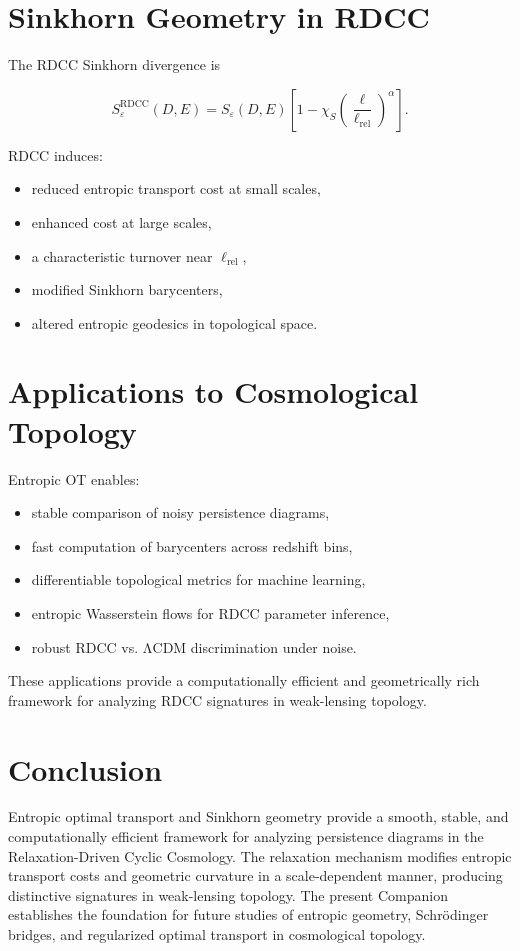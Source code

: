 \documentclass[11pt,a4paper]{article}
\begin{document}
\section{Sinkhorn Geometry in RDCC}

The RDCC Sinkhorn divergence is

\begin{equation}
    S^{\mathrm{RDCC}}_{\varepsilon}(D,E)
    = S_{\varepsilon}(D,E)
      \left[
        1 - \chi_{S}
        \left(\frac{\ell}{\ell_{\mathrm{rel}}}\right)^{\alpha}
      \right].
\end{equation}

RDCC induces:

\begin{itemize}
    \item reduced entropic transport cost at small scales,
    \item enhanced cost at large scales,
    \item a characteristic turnover near $\ell_{\mathrm{rel}}$,
    \item modified Sinkhorn barycenters,
    \item altered entropic geodesics in topological space.
\end{itemize}
\section{Applications to Cosmological Topology}

Entropic OT enables:

\begin{itemize}
    \item stable comparison of noisy persistence diagrams,
    \item fast computation of barycenters across redshift bins,
    \item differentiable topological metrics for machine learning,
    \item entropic Wasserstein flows for RDCC parameter inference,
    \item robust RDCC vs. ΛCDM discrimination under noise.
\end{itemize}

These applications provide a computationally efficient and geometrically rich 
framework for analyzing RDCC signatures in weak-lensing topology.
\section{Conclusion}

Entropic optimal transport and Sinkhorn geometry provide a smooth, stable, and 
computationally efficient framework for analyzing persistence diagrams in the 
Relaxation-Driven Cyclic Cosmology. The relaxation mechanism modifies entropic 
transport costs and geometric curvature in a scale-dependent manner, producing 
distinctive signatures in weak-lensing topology. The present Companion establishes 
the foundation for future studies of entropic geometry, Schrödinger bridges, and 
regularized optimal transport in cosmological topology.


\nocite{*}

\end{document}

